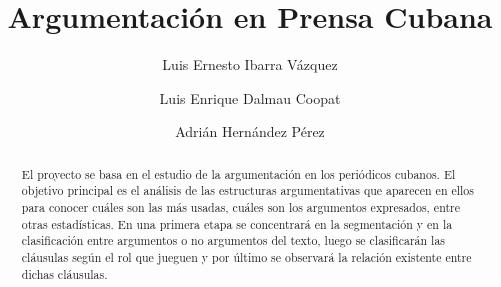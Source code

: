 \documentclass[runningheads]{llncs}
\begin{document}
%
\title{Argumentación en Prensa Cubana}
%
%
\author{Luis Ernesto Ibarra Vázquez \and
Luis Enrique Dalmau Coopat \and 
Adrián Hernández Pérez}
%
%
%
\maketitle              %
%
\begin{abstract}

El proyecto se basa en el estudio de la argumentación en los periódicos cubanos. 
El objetivo principal es el análisis de las estructuras argumentativas que aparecen 
en ellos para conocer cuáles son las más usadas, cuáles son los argumentos expresados, 
entre otras estadísticas. En una primera etapa se concentrará en la segmentación y en 
la clasificación entre argumentos o no argumentos del texto, luego se clasificarán las
cláusulas según el rol que jueguen y por último se observará la relación existente 
entre dichas cláusulas.

\end{abstract}
%
%
%
%
%
%
\end{document}
